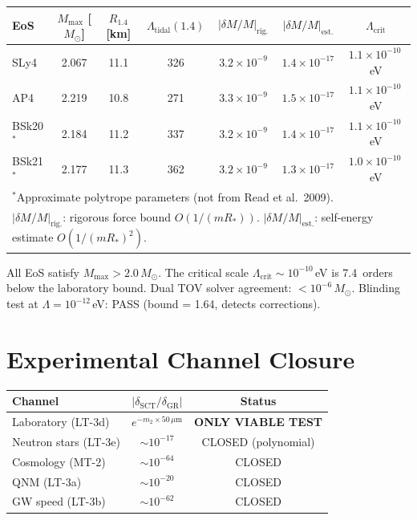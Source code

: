 \documentclass[12pt,a4paper]{article}
\newcommand{\Lam}{\Lambda}
\newcommand{\Msun}{M_\odot}
\newcommand{\Mmax}{M_{\mathrm{max}}}
\newcommand{\Rstar}{R_*}
\begin{document}
\begin{center}
\begin{tabular}{lcccccc}
\toprule
\textbf{EoS} & $\Mmax$ [$\Msun$] & $R_{1.4}$ [km] &
$\Lambda_{\mathrm{tidal}}(1.4)$ & $|\delta M/M|_{\mathrm{rig.}}$ &
$|\delta M/M|_{\mathrm{est.}}$ & $\Lam_{\mathrm{crit}}$ \\
\midrule
SLy4  & 2.067 & 11.1 & 326 & $3.2 \times 10^{-9}$ & $1.4 \times 10^{-17}$ & $1.1 \times 10^{-10}$\,eV \\
AP4   & 2.219 & 10.8 & 271 & $3.3 \times 10^{-9}$ & $1.5 \times 10^{-17}$ & $1.1 \times 10^{-10}$\,eV \\
BSk20$^*$ & 2.184 & 11.2 & 337 & $3.2 \times 10^{-9}$ & $1.4 \times 10^{-17}$ & $1.1 \times 10^{-10}$\,eV \\
BSk21$^*$ & 2.177 & 11.3 & 362 & $3.2 \times 10^{-9}$ & $1.3 \times 10^{-17}$ & $1.0 \times 10^{-10}$\,eV \\
\bottomrule
\multicolumn{7}{l}{\footnotesize $^*$Approximate polytrope parameters (not from Read et al.\ 2009).} \\
\multicolumn{7}{l}{\footnotesize $|\delta M/M|_{\mathrm{rig.}}$: rigorous force bound $O(1/(m\Rstar))$.
$|\delta M/M|_{\mathrm{est.}}$: self-energy estimate $O(1/(m\Rstar)^2)$.}
\end{tabular}
\end{center}

\noindent
All EoS satisfy $\Mmax > 2.0\,\Msun$.
The critical scale $\Lam_{\mathrm{crit}} \sim 10^{-10}$\,eV is
7.4~orders below the laboratory bound.
Dual TOV solver agreement: $< 10^{-6}\,\Msun$.
Blinding test at $\Lam = 10^{-12}$\,eV: PASS (bound = 1.64, detects corrections).

\section{Experimental Channel Closure}
\label{sec:closure}

\begin{center}
\begin{tabular}{lcc}
\toprule
\textbf{Channel} & $|\delta_{\mathrm{SCT}}/\delta_{\mathrm{GR}}|$ & \textbf{Status} \\
\midrule
Laboratory (LT-3d) & $e^{-m_2 \times 50\,\mu\mathrm{m}}$ & \textbf{ONLY VIABLE TEST} \\
Neutron stars (LT-3e) & $\sim 10^{-17}$ & CLOSED (polynomial) \\
Cosmology (MT-2) & $\sim 10^{-64}$ & CLOSED \\
QNM (LT-3a) & $\sim 10^{-20}$ & CLOSED \\
GW speed (LT-3b) & $\sim 10^{-62}$ & CLOSED \\
\bottomrule
\end{tabular}
\end{center}
\end{document}
